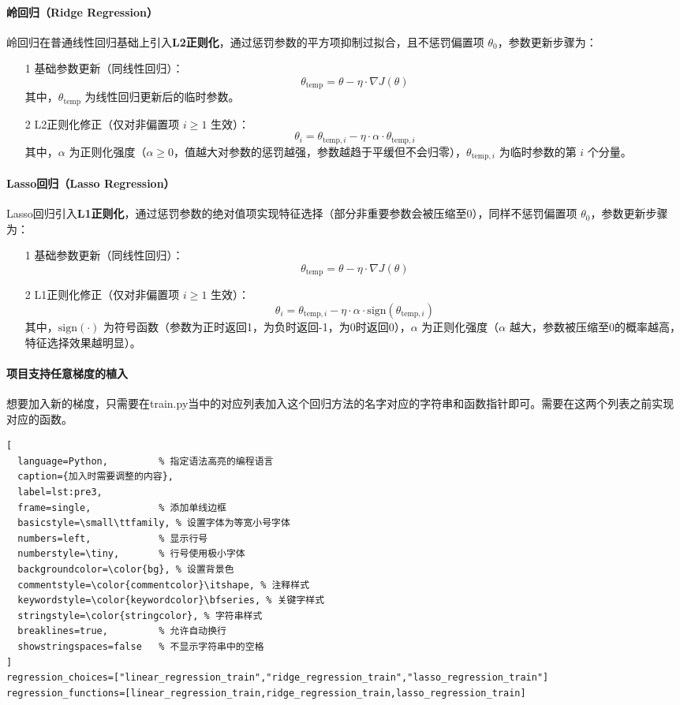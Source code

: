 \paragraph{岭回归（Ridge Regression）}
岭回归在普通线性回归基础上引入\textbf{L2正则化}，通过惩罚参数的平方项抑制过拟合，且不惩罚偏置项 $\theta_0$，参数更新步骤为：
\begin{itemize}
\item [1] 基础参数更新（同线性回归）：
\[
\theta_{\text{temp}} = \theta - \eta \cdot \nabla J(\theta)
\]
其中，$\theta_{\text{temp}}$ 为线性回归更新后的临时参数。

\item [2] L2正则化修正（仅对非偏置项 $i \geq 1$ 生效）：
\[
\theta_i = \theta_{\text{temp},i} - \eta \cdot \alpha \cdot \theta_{\text{temp},i}
\]
其中，$\alpha$ 为正则化强度（$\alpha \geq 0$，值越大对参数的惩罚越强，参数越趋于平缓但不会归零），$\theta_{\text{temp},i}$ 为临时参数的第 $i$ 个分量。
\end{itemize}

\paragraph{Lasso回归（Lasso Regression）}
Lasso回归引入\textbf{L1正则化}，通过惩罚参数的绝对值项实现特征选择（部分非重要参数会被压缩至0），同样不惩罚偏置项 $\theta_0$，参数更新步骤为：
\begin{itemize}
\item [1] 基础参数更新（同线性回归）：
\[
\theta_{\text{temp}} = \theta - \eta \cdot \nabla J(\theta)
\]

\item [2] L1正则化修正（仅对非偏置项 $i \geq 1$ 生效）：
\[
\theta_i = \theta_{\text{temp},i} - \eta \cdot \alpha \cdot \text{sign}(\theta_{\text{temp},i})
\]
其中，$\text{sign}(\cdot)$ 为符号函数（参数为正时返回1，为负时返回-1，为0时返回0），$\alpha$ 为正则化强度（$\alpha$ 越大，参数被压缩至0的概率越高，特征选择效果越明显）。
\end{itemize}

\paragraph{项目支持任意梯度的植入}
想要加入新的梯度，只需要在train.py当中的对应列表加入这个回归方法的名字对应的字符串和函数指针即可。需要在这两个列表之前实现对应的函数。
\begin{lstlisting}[
  language=Python,         % 指定语法高亮的编程语言
  caption={加入时需要调整的内容},
  label=lst:pre3,
  frame=single,            % 添加单线边框
  basicstyle=\small\ttfamily, % 设置字体为等宽小号字体
  numbers=left,            % 显示行号
  numberstyle=\tiny,       % 行号使用极小字体
  backgroundcolor=\color{bg}, % 设置背景色
  commentstyle=\color{commentcolor}\itshape, % 注释样式
  keywordstyle=\color{keywordcolor}\bfseries, % 关键字样式
  stringstyle=\color{stringcolor}, % 字符串样式
  breaklines=true,         % 允许自动换行
  showstringspaces=false   % 不显示字符串中的空格
]
regression_choices=["linear_regression_train","ridge_regression_train","lasso_regression_train"]
regression_functions=[linear_regression_train,ridge_regression_train,lasso_regression_train]
\end{lstlisting}
